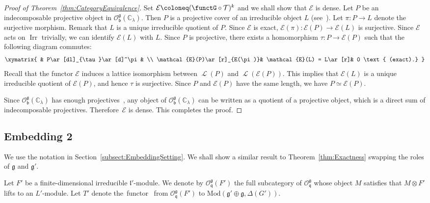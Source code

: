 \documentclass[10pt,a4paper]{amsart}
\numberwithin{equation}{section}
\theoremstyle{definition}
\newcommand{\BasicRing}[1]{\mathbb{#1}}
\newcommand{\CC}{\BasicRing{C}}
\newcommand{\Mod}{\mathrm{Mod}}
\newcommand{\lieC}[1]{\mathfrak{#1}}
\newcommand{\lie}[1]{\mathfrak{#1}}
\newcommand{\ind}[2]{\mathrm{ind}^{\lieC{#1}}_{\lieC{#2}}}
\newcommand{\BGGcat}[2]{\mathcal{O}_{\lie{#2}}^{\lie{#1}}}
\newcommand{\zuck}[2]{\Gamma^{#1}_{#2}}
\newcommand{\Dzuck}[3]{R^{#3}\zuck{#1}{#2}}
\DeclareMathOperator{\lattice}{\mathcal{L}}
\DeclareMathOperator{\Irr}{\mathrm{Irr}}
\begin{document}
\begin{proof}[Proof of Theorem~\ref{thm:CategoryEquivalence}]
	Set $\mathcal{E}\coloneq(\functG\circ \mathcal{T})^k$ and we shall show that $\mathcal{E}$ is dense.
	Let $P$ be an indecomposable projective object in $\BGGcat{g}{b}(\CC_\lambda)$.
	Then $P$ is a projective cover of an irreducible object $L$ (see~\cite[Section 3.9]{Hu08_category_o}).
	Let $\pi \colon P\rightarrow L$ denote the surjective morphism.
	Remark that $L$ is a unique irreducible quotient of $P$.
	Since $\mathcal{E}$ is exact, $\mathcal{E}(\pi)\colon \mathcal{E}(P) \rightarrow \mathcal{E}(L)$ is surjective.
	Since $\mathcal{E}$ acts on $\Irr$ trivially, we can identify $\mathcal{E}(L)$ with $L$.
	Since $P$ is projective, there exists a homomorphism $\tau\colon P \rightarrow \mathcal{E}(P)$ such
	that the following diagram commutes:
	\begin{align*}
		\xymatrix{
		& P\ar[dl]_{\tau}\ar[d]^\pi& \\
		\mathcal{E}(P)\ar[r]_{E(\pi)}& \mathcal{E}(L) = L\ar[r]& 0 \text{ (exact).}
		}
	\end{align*}
	Recall that the functor $\mathcal{E}$ induces a lattice isomorphism between $\lattice(P)$ and $\lattice(\mathcal{E}(P))$.
	This implies that $\mathcal{E}(L)$ is a unique irreducible quotient of $\mathcal{E}(P)$, and hence $\tau$ is surjective.
	Since $P$ and $\mathcal{E}(P)$ have the same length, we have $P \simeq \mathcal{E}(P)$.

	Since $\BGGcat{g}{b}(\CC_\lambda)$ has enough projectives~\cite[Section 3.9]{Hu08_category_o},
	any object of $\BGGcat{g}{b}(\CC_\lambda)$
	can be written as a quotient of a projective object, which is a direct sum of indecomposable projectives.
	Therefore~$\mathcal{E}$ is dense.
	This completes the proof.
\end{proof}

\subsection{Embedding 2}

We use the notation in Section~\ref{subsect:EmbeddingSetting}.
We shall show a similar result to Theorem~\ref{thm:Exactness} swapping the roles of $\lie{g}$ and $\lie{g'}$.

Let $F'$ be a finite-dimensional irreducible $\lie{l'}$-module.
We denote by $\BGGcat{g}{q}(F')$ the full subcategory of $\BGGcat{g}{q}$ whose object $M$ satisfies that $M\otimes F'$ lifts to an $L'$-module.
Let $T'$ denote the~func\-tor~\smash{$\Dzuck{\Delta(G')}{\Delta(L')}{S}\bigl(\ind{g'}{q'}(F') \otimes \cdot\bigr)$} from $\BGGcat{g}{q}(F')$ to $\Mod(\lie{g'\oplus g}, \Delta(G'))$.
\end{document}
